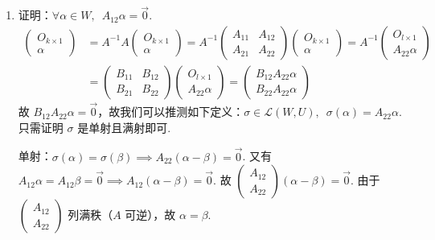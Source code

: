 \begin{enumerate}
    \item 证明：$ \forall \alpha \in W,\enspace A_{12} \alpha = \vec{0} $.
          \begin{align*}
              \begin{pmatrix} O_{k \times 1} \\ \alpha \end{pmatrix}
               & = A^{-1}A \begin{pmatrix} O_{k \times 1} \\ \alpha \end{pmatrix} = A^{-1} \begin{pmatrix} A_{11} & A_{12} \\ A_{21} & A_{22} \end{pmatrix} \begin{pmatrix} O_{k \times 1} \\ \alpha \end{pmatrix} = A^{-1} \begin{pmatrix} O_{l \times 1} \\ A_{22} \alpha \end{pmatrix} \\
               & = \begin{pmatrix} B_{11} & B_{12} \\ B_{21} & B_{22} \end{pmatrix} \begin{pmatrix} O_{l \times 1} \\ A_{22} \alpha \end{pmatrix} = \begin{pmatrix} B_{12} A_{22} \alpha \\ B_{22} A_{22} \alpha \end{pmatrix}
          \end{align*}
          故 $ B_{12} A_{22} \alpha = \vec{0} $，故我们可以推测如下定义：$ \sigma \in \mathcal{L}(W,U),\enspace \sigma(\alpha) = A_{22} \alpha $.
          只需证明 $ \sigma $ 是单射且满射即可.

          单射：$ \sigma(\alpha) = \sigma(\beta) \implies A_{22}(\alpha - \beta) = \vec{0} $. 又有 $ A_{12} \alpha = A_{12} \beta = \vec{0} \implies A_{12}( \alpha - \beta) = \vec{0} $. 故 $ \begin{pmatrix} A_{12} \\ A_{22} \end{pmatrix} (\alpha - \beta) = \vec{0} $. 由于 $ \begin{pmatrix} A_{12} \\ A_{22} \end{pmatrix} $ 列满秩（$ A $ 可逆），故 $ \alpha = \beta $.


\end{enumerate}
